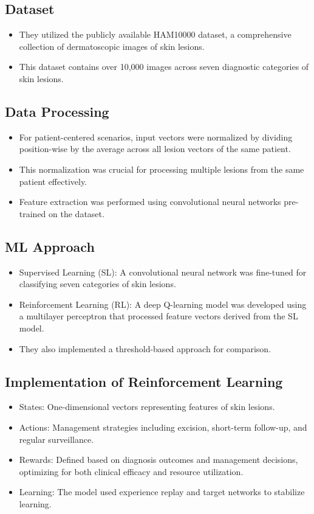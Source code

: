 \subsection*{Dataset}
\begin{itemize}
    \item They utilized the publicly available HAM10000 dataset, a comprehensive collection of dermatoscopic images of skin lesions.
    \item This dataset contains over 10,000 images across seven diagnostic categories of skin lesions.
\end{itemize}

\subsection*{Data Processing}
\begin{itemize}
    \item For patient-centered scenarios, input vectors were normalized by dividing position-wise by the average across all lesion vectors of the same patient.
    \item This normalization was crucial for processing multiple lesions from the same patient effectively.
    \item Feature extraction was performed using convolutional neural networks pre-trained on the dataset.
\end{itemize}

\subsection*{ML Approach}
\begin{itemize}
    \item Supervised Learning (SL): A convolutional neural network was fine-tuned for classifying seven categories of skin lesions.
    \item Reinforcement Learning (RL): A deep Q-learning model was developed using a multilayer perceptron that processed feature vectors derived from the SL model.
    \item They also implemented a threshold-based approach for comparison.
\end{itemize}

\subsection*{Implementation of Reinforcement Learning}
\begin{itemize}
    \item States: One-dimensional vectors representing features of skin lesions.
    \item Actions: Management strategies including excision, short-term follow-up, and regular surveillance.
    \item Rewards: Defined based on diagnosis outcomes and management decisions, optimizing for both clinical efficacy and resource utilization.
    \item Learning: The model used experience replay and target networks to stabilize learning.
\end{itemize}

